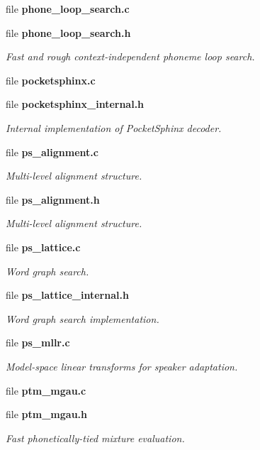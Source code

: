 \begin{DoxyCompactItemize}
file {\bfseries phone\+\_\+loop\+\_\+search.\+c}
\item 
file {\bf phone\+\_\+loop\+\_\+search.\+h}
\begin{DoxyCompactList}\small\item\em Fast and rough context-\/independent phoneme loop search. \end{DoxyCompactList}\item 
file {\bfseries pocketsphinx.\+c}
\item 
file {\bf pocketsphinx\+\_\+internal.\+h}
\begin{DoxyCompactList}\small\item\em Internal implementation of Pocket\+Sphinx decoder. \end{DoxyCompactList}\item 
file {\bf ps\+\_\+alignment.\+c}
\begin{DoxyCompactList}\small\item\em Multi-\/level alignment structure. \end{DoxyCompactList}\item 
file {\bf ps\+\_\+alignment.\+h}
\begin{DoxyCompactList}\small\item\em Multi-\/level alignment structure. \end{DoxyCompactList}\item 
file {\bf ps\+\_\+lattice.\+c}
\begin{DoxyCompactList}\small\item\em Word graph search. \end{DoxyCompactList}\item 
file {\bf ps\+\_\+lattice\+\_\+internal.\+h}
\begin{DoxyCompactList}\small\item\em Word graph search implementation. \end{DoxyCompactList}\item 
file {\bf ps\+\_\+mllr.\+c}
\begin{DoxyCompactList}\small\item\em Model-\/space linear transforms for speaker adaptation. \end{DoxyCompactList}\item 
file {\bfseries ptm\+\_\+mgau.\+c}
\item 
file {\bf ptm\+\_\+mgau.\+h}
\begin{DoxyCompactList}\small\item\em Fast phonetically-\/tied mixture evaluation. \end{DoxyCompactList}\item 

\end{DoxyCompactItemize}
